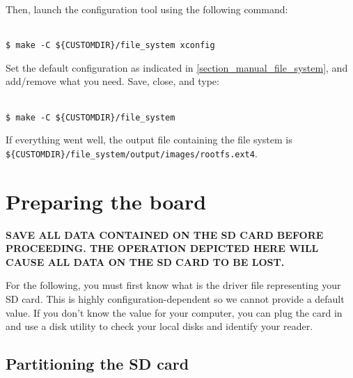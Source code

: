 \documentclass[openany,a4paper]{book}
\begin{document}
Then, launch the configuration tool using the following command:

\begin{tabbing}
\kill \hspace{1cm} \= \\
\> \texttt{\$ make -C \$\{CUSTOMDIR\}/file\_system xconfig}\\
\end{tabbing}

Set the default configuration as indicated in \ref{section_manual_file_system}, and add/remove what you need.
Save, close, and type:

\begin{tabbing}
\kill \hspace{1cm} \= \\
\> \texttt{\$ make -C \$\{CUSTOMDIR\}/file\_system }\\
\end{tabbing}

If everything went well, the output file containing the file system is \nolinkurl{${CUSTOMDIR}/file\_system/output/images/rootfs.ext4}.




\chapter{Preparing the board}

\begin{center}
\textbf{SAVE ALL DATA CONTAINED ON THE SD CARD BEFORE PROCEEDING. THE OPERATION DEPICTED HERE WILL CAUSE ALL DATA ON THE SD CARD TO BE LOST.}
\end{center}

For the following, you must first know what is the driver file representing your SD card.
This is highly configuration-dependent so we cannot provide a default value.
If you don't know the value for your computer, you can plug the card in and use a disk utility to check your local disks and identify your reader.


\section{Partitioning the SD card}\label{Partitionning}
\end{document}
